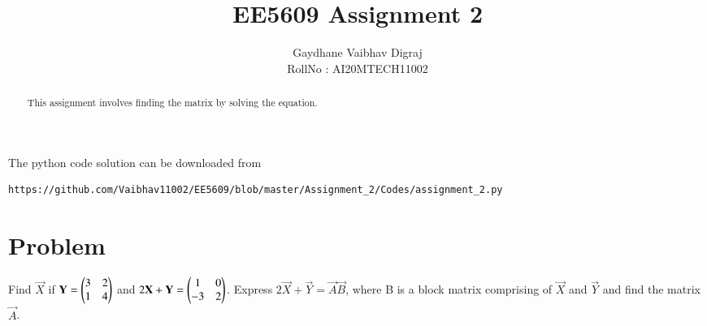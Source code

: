 \documentclass[journal,12pt,twocolumn]{IEEEtran}
\begin{document}
    \def\rightbox#1{\makebox[0in][r]{#1}}
 \def\centbox#1{\makebox[0in]{#1}}
     \def\topbox#1{\raisebox{-\baselineskip}[0in][0in]{#1}}
     \def\midbox#1{\raisebox{-0.5\baselineskip}[0in][0in]{#1}}
\vspace{3cm}
\title{EE5609 Assignment 2}
\author{Gaydhane Vaibhav Digraj \\ RollNo : AI20MTECH11002 }
\maketitle
\newpage
\bigskip
\renewcommand{\thefigure}{\theenumi}
\renewcommand{\thetable}{\theenumi}
\begin{abstract}
This assignment involves finding the matrix  by solving the equation. 
\end{abstract}
The python code solution can be downloaded from
\begin{lstlisting}
https://github.com/Vaibhav11002/EE5609/blob/master/Assignment_2/Codes/assignment_2.py
\end{lstlisting}
\section{Problem}
Find $\vec{X}$ if $\mathbf{Y} = \begin{pmatrix} 3 & 2 \\ 1 & 4 \end{pmatrix}$ and $2\mathbf{X}+\mathbf{Y} = \begin{pmatrix}1 & 0 \\ -3 & 2\end{pmatrix}$. Express $2\vec{X}+\vec{Y} = \vec{A}\vec{B}$, where B is a block matrix comprising of $\vec{X}$ and $\vec{Y}$ and find the matrix $\vec{A}$. 
\vspace{2mm}
\end{document}

